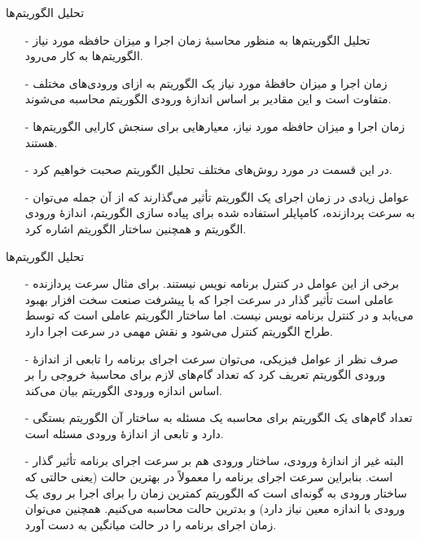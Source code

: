 \begin{frame}{‌تحلیل الگوریتم‌ها}
\begin{itemize}\itemr
\item[-]
تحلیل الگوریتم‌ها به منظور محاسبهٔ زمان اجرا و میزان حافظه مورد نیاز الگوریتم‌ها به کار می‌رود.
\item[-]
زمان اجرا و میزان حافظهٔ مورد نیاز یک الگوریتم به ازای ورودی‌های مختلف متفاوت است و این مقادیر بر اساس اندازهٔ ورودی الگوریتم محاسبه می‌شوند.
\item[-]
زمان اجرا و میزان حافظه مورد نیاز، معیارهایی برای سنجش کارایی الگوریتم‌ها هستند.
\item[-]
در این قسمت در مورد روش‌های مختلف تحلیل الگوریتم صحبت خواهیم کرد.
\item[-]
عوامل زیادی در زمان اجرای یک الگوریتم تأثیر می‌گذارند که از آن جمله می‌توان به سرعت پردازنده، کامپایلر استفاده شده برای پیاده سازی الگوریتم، اندازهٔ ورودی الگوریتم و همچنین ساختار الگوریتم اشاره کرد.
\end{itemize}
\end{frame}


\begin{frame}{‌تحلیل الگوریتم‌ها}
\begin{itemize}\itemr
\item[-]
برخی از این عوامل در کنترل برنامه نویس نیستند. برای مثال سرعت پردازنده عاملی است تأثیر گذار در سرعت اجرا که با پیشرفت صنعت سخت افزار بهبود می‌یابد و در کنترل برنامه نویس نیست. اما ساختار الگوریتم عاملی است که توسط طراح الگوریتم کنترل می‌شود و نقش مهمی در سرعت اجرا دارد.
\item[-]
صرف نظر از عوامل فیزیکی، می‌توان سرعت اجرای برنامه را تابعی از اندازهٔ ورودی الگوریتم تعریف کرد که تعداد گام‌های لازم برای محاسبهٔ خروجی را بر اساس اندازه ورودی الگوریتم بیان می‌کند.
\item[-]
تعداد گام‌های یک الگوریتم برای محاسبه یک مسئله به ساختار آن الگوریتم بستگی دارد و تابعی از اندازهٔ ورودی مسئله است.
\item[-]
البته غیر از اندازهٔ ورودی، ساختار ورودی هم بر سرعت اجرای برنامه تأثیر گذار است. بنابراین سرعت اجرای برنامه را معمولاً در بهترین حالت (یعنی حالتی که ساختار ورودی به گونه‌ای است که الگوریتم کمترین زمان را برای اجرا بر روی یک ورودی با اندازه معین نیاز دارد) و بدترین حالت محاسبه می‌کنیم. همچنین می‌توان زمان اجرای برنامه را در حالت میانگین به دست آورد.
\end{itemize}
\end{frame}


